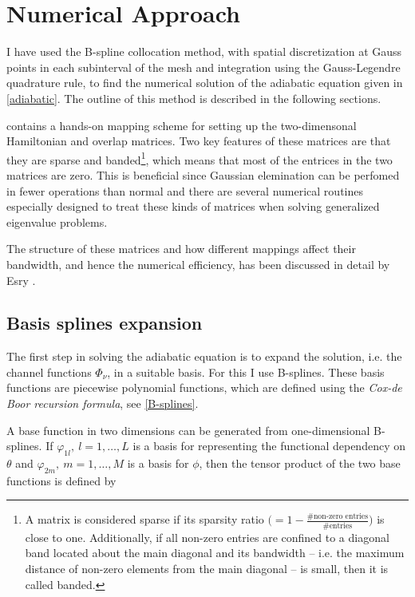 \chapter{Numerical Approach}\label{chapter:5}
I have used the B-spline collocation method, with spatial discretization at Gauss points in each subinterval of the mesh and integration using the Gauss-Legendre quadrature rule, to find the numerical solution of the adiabatic equation given in \eqref{adiabatic}. The outline of this method is described in the following sections. 

 contains a hands-on mapping scheme for setting up the two-dimensonal Hamiltonian and overlap matrices. Two key features of these matrices are that they are sparse and banded\footnote{A matrix is considered sparse if its sparsity ratio $\big(=1 - \frac{\# \text{non-zero entries}}{\#\text{entries}}\big)$ is close to one. Additionally, if all non-zero entries are confined to a diagonal band located about the main diagonal and its bandwidth -- i.e. the maximum distance of non-zero elements from the main diagonal -- is small, then it is called banded.}, which means that most of the entrices in the two matrices are zero. This is beneficial since Gaussian elemination can be perfomed in fewer operations than normal and there are several numerical routines especially designed to treat these kinds of matrices when solving generalized eigenvalue problems. 

The structure of these matrices and how different mappings affect their bandwidth, and hence the numerical efficiency, has been discussed in detail by Esry \cite{Esry_thesis}.   

\section{Basis splines expansion}\label{section:BSexpansion}
The first step in solving the adiabatic equation is to expand the solution, i.e. the channel functions $\Phi_{\nu}$, in a suitable basis. For this I use B-splines. These basis functions are piecewise polynomial functions, which are defined using the \emph{Cox-de Boor recursion formula}, see \cref{B-splines}. 

A base function in two dimensions can be generated from one-dimensional B-splines. If $\varphi_{1l}, \ l= 1,\ldots,L$ is a basis for representing the functional dependency on $\theta$ and $\varphi_{2m}, \ m= 1,\ldots,M$ is a basis for $\phi$, then the tensor product of the two base functions is defined by

